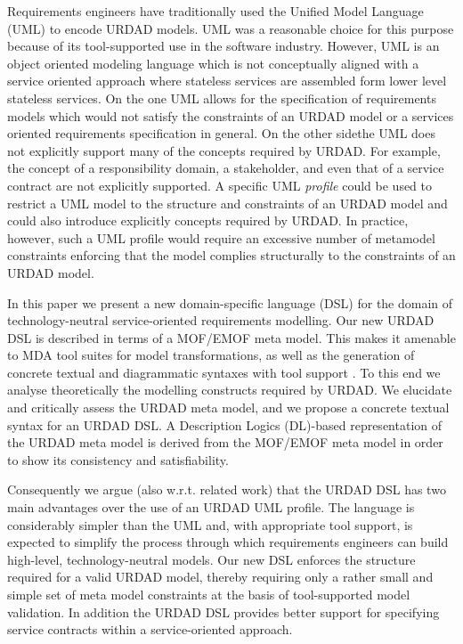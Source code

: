Requirements engineers have traditionally used the Unified Model Language (UML) to encode URDAD models. UML was a reasonable choice for this purpose because of its tool-supported use in the software industry. However, UML is an object oriented modeling language which is not conceptually aligned with a service oriented approach where stateless services are assembled form lower level stateless services. On the one UML allows for the specification of requirements models which would not satisfy the constraints of an URDAD model or a services oriented requirements specification in general. On the other sidethe UML does not explicitly support many of the concepts required by URDAD. For example, the concept of a responsibility domain, a stakeholder, and even that of a service contract are not explicitly supported. A specific UML \emph{profile} could be used to restrict a UML model to the structure and constraints of an URDAD model and could also introduce explicitly concepts required by URDAD. In practice, however, such a UML profile would require an excessive number of metamodel constraints enforcing that the model complies structurally to the constraints of an URDAD model.

In this paper we present a new domain-specific language (DSL) for the domain of technology-neutral service-orien\-ted requirements modelling. Our new URDAD DSL is described in terms of a MOF/EMOF meta model. This makes it amenable to MDA tool suites for model transformations, as well as the generation of concrete textual and diagrammatic syntaxes with tool support \cite{gronback_model_2008}. To this end we analyse theoretically the modelling constructs required by URDAD. We elucidate and critically assess the URDAD meta model, and we propose a concrete textual syntax for an URDAD DSL. A Description Logics (DL)-based representation of the URDAD meta model is derived from the MOF/EMOF meta model in order to show its consistency and satisfiability.

Consequently we argue (also w.r.t. related work) that the URDAD DSL has two main advantages over the use of an URDAD UML profile. The language is considerably simpler than the UML and, with appropriate tool support, is expected to simplify the process through which requirements engineers can build high-level, technology-neutral models. Our new DSL enforces the structure required for a valid URDAD model, thereby requiring only a rather small and simple set of meta model constraints at the basis of tool-supported model validation. In addition the URDAD DSL provides better support for specifying service contracts within a service-oriented approach.

